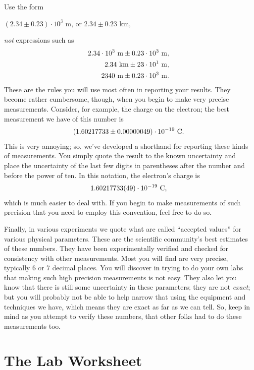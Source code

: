 \noindent Use the form
\begin{center}
$(2.34 \pm 0.23) \cdot 10^3$ m, or $2.34 \pm 0.23$ km,
\end{center}
{\it not} expressions such as
\begin{eqnarray*}
2.34 \cdot 10^3~{\rm m} \pm 0.23 \cdot 10^3~{\rm m},\\
2.34~{\rm km} \pm 23 \cdot10^1~{\rm m},\\
2340~{\rm m} \pm 0.23 \cdot 10^3~{\rm m}.
\end{eqnarray*}
These are the rules you will use most often in reporting your results. They 
become rather cumbersome, though, when you begin to make very precise 
measurements. Consider, for example, the charge on the electron; the best 
measurement we have of this number is
\begin{eqnarray*}
(1.60217733 \pm 0.00000049) \cdot 10^{-19}~{\rm C}.
\end{eqnarray*}
This is very annoying; so, we've developed a shorthand for reporting these 
kinds of measurements. You simply quote the result to the known uncertainty and
place the uncertainty of the last few digits in parentheses after the number 
and before the power of ten. In this notation, the electron's charge is
\begin{eqnarray*}
1.60217733(49) \cdot 10^{-19}~{\rm C},
\end{eqnarray*}
which is much easier to deal with. If you begin to make measurements of such 
precision that you need to employ this convention, feel free to do so.

Finally, in various experiments we quote what are called ``accepted values''
for various physical parameters. These are the scientific community's best 
estimates of these numbers. They have been experimentally verified and checked 
for consistency with other measurements. Most you will find are very precise, 
typically 6 or 7 decimal places. You will discover in trying to do your own 
labs that making such high precision measurements is not easy. They also let 
you know that there is still some uncertainty in these parameters; they are
not {\em exact}; but you will probably not be able to help narrow that using 
the equipment and techniques we have, which means they are exact as far as we 
can tell. So, keep in mind as you attempt to verify these numbers, that other 
folks had to do these measurements too.  

\section{The Lab Worksheet}

